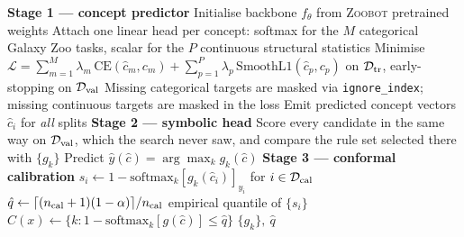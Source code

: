 \documentclass[11pt]{article}
\newcommand{\code}[1]{\texttt{\small #1}}
\begin{document}
\begin{algorithm}[htbp]
\SetAlgoLined
\DontPrintSemicolon
{}
\vspace{2pt}
\textbf{Stage 1 --- concept predictor}\;
Initialise backbone $f_\theta$ from \textsc{Zoobot} pretrained weights\;
Attach one linear head per concept: softmax for the $M$ categorical Galaxy
Zoo tasks, scalar for the $P$ continuous structural statistics\;
Minimise
$\mathcal{L} = \sum_{m=1}^{M}\lambda_m\,\mathrm{CE}(\hat c_m, c_m)
             + \sum_{p=1}^{P}\lambda_p\,\mathrm{SmoothL1}(\hat c_p, c_p)$
on $\mathcal{D}_{\rm tr}$, early-stopping on $\mathcal{D}_{\rm val}$\;
Missing categorical targets are masked via \code{ignore\_index}; missing
continuous targets are masked in the loss\;
Emit predicted concept vectors $\hat c_i$ for \emph{all} splits\;
\vspace{2pt}
\textbf{Stage 2 --- symbolic head} 
Score every candidate in the same way on $\mathcal{D}_{\rm val}$, which the
search never saw, and compare the rule set selected there with $\{g_k\}$\;
Predict $\hat y(\hat c) = \arg\max_k g_k(\hat c)$\;
\vspace{2pt}
\textbf{Stage 3 --- conformal calibration}\;
$s_i \leftarrow 1 - \mathrm{softmax}_k\!\left[g_k(\hat c_i)\right]_{y_i}$
for $i \in \mathcal{D}_{\rm cal}$ 
$\hat q \leftarrow \lceil (n_{\rm cal}+1)(1-\alpha)\rceil / n_{\rm cal}$
empirical quantile of $\{s_i\}$\;
$C(x) \leftarrow \{k : 1 - \mathrm{softmax}_k[g(\hat c)] \le \hat q\}$\;
\Return $\{g_k\},\ \hat q$\;
\caption{Symbolic concept-bottleneck classification with conformal
uncertainty.}
\label{alg:pipeline}
\end{algorithm}
\end{document}
